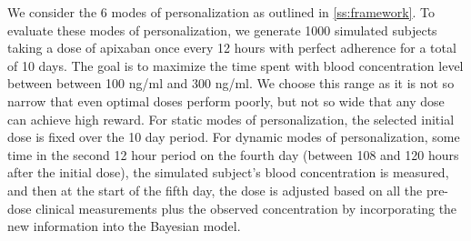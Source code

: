 
We consider the 6 modes of personalization as outlined in \cref{ss:framework}.  To evaluate these modes of personalization, we generate 1000 simulated subjects taking a dose of apixaban once every 12 hours with perfect adherence for a total of 10 days. The goal is to maximize the time spent with blood concentration level between between 100 ng/ml and 300 ng/ml. We choose this range as it is not so narrow that even optimal doses perform poorly, but not so wide that any dose can achieve high reward. For static modes of personalization, the selected initial dose is fixed over the 10 day period. For dynamic modes of personalization, some time in the second 12 hour period on the fourth day (between 108 and 120 hours after the initial dose), the simulated subject’s blood concentration is measured, and then at the start of the fifth day, the dose is adjusted based on all the pre-dose clinical measurements plus the observed concentration by incorporating the new information into the Bayesian model. 


